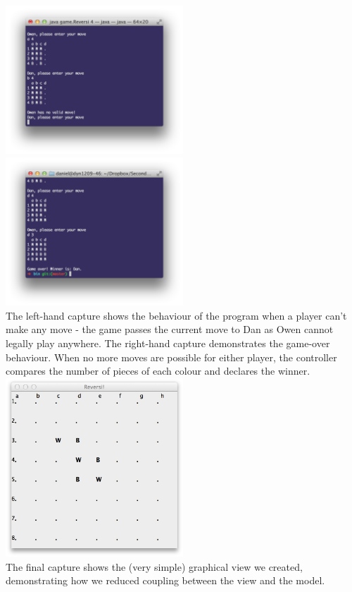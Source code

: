 \documentclass[11pt,a4paper,oneside]{article}
\begin{document}
\noindent
\includegraphics[width=0.5\textwidth]{screenies/invalidsmall}
\includegraphics[width=0.5\textwidth]{screenies/winning}\\

\noindent The left-hand capture shows the behaviour of the program when a player can't make any move - the game passes the current move to Dan as Owen cannot legally play anywhere. The right-hand capture demonstrates the game-over behaviour. When no more moves are possible for either player, the controller compares the number of pieces of each colour and declares the winner.\\

\noindent
\includegraphics[width=0.5\textwidth]{screenies/graphical}\\

\noindent The final capture shows the (very simple) graphical view we created, demonstrating how we reduced coupling between the view and the model.
\end{document}
